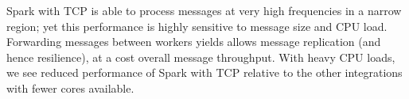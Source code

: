 \documentclass[conference]{IEEEtran}
\begin{document}
Spark with TCP is able to process messages at very high frequencies in a narrow region; yet this performance is highly sensitive to message size and CPU load. Forwarding messages between workers yields allows message replication (and hence resilience), at a cost overall message throughput.
With heavy CPU loads, we see reduced performance of Spark with TCP relative to the other integrations with fewer cores available. 

\end{document}
